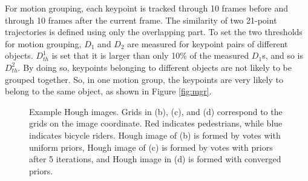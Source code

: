 \documentclass[10pt,twocolumn,letterpaper]{article}
\begin{document}
For motion grouping, each keypoint is tracked through 10 frames before and through 10 frames after the current frame. The similarity of two 21-point trajectories is defined using only the overlapping part. To set the two thresholds for motion grouping, $D_1$ and $D_2$ are  measured for keypoint pairs of different objects. $D^1_{th}$ is set that it is larger than only 10\% of the measured $D_1$s, and so is $D^2_{th}$. By doing so, keypoints belonging to different objects are not likely to be grouped together. So, in one motion group, the keypoints are very likely to belong to the same object, as shown in Figure \ref{fig:mgr}.



\begin{figure}
\centering
{}

\caption{Example Hough images. Grids in (b), (c), and (d) correspond to the grids on the image coordinate. Red indicates pedestrians, while blue indicates bicycle riders. Hough image of (b) is formed by votes with uniform priors, Hough image of (c) is formed by votes with priors after 5 iterations, and Hough image in (d) is formed with converged priors.}
\label{fig:Hough}
\end{figure}
\end{document}
